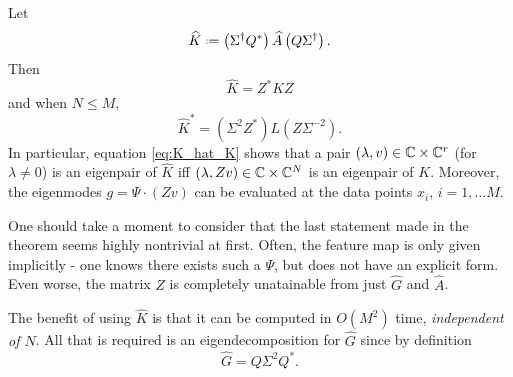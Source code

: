 \begin{theorem}
    \label{thm:K_hat}
    Let 
    \begin{equation}
        \label{eq:K_hat}
        \widehat{K} \defeq 
        \left( \Sigma^\dagger Q^* \right) \widehat{A} \left( Q \Sigma^\dagger \right) . 
    \end{equation}
    Then 
    \begin{equation}
        \label{eq:K_hat_K}
        \widehat{ K } = Z^* K Z
    \end{equation}
    and when $N \leq M$, 
    \begin{equation}
        \widehat{ K }^* = \left( \Sigma^2 Z^* \right) L \left( Z \Sigma^{-2} \right) . 
    \end{equation}
    In particular, equation \ref{eq:K_hat_K} shows that
    a pair $(\lambda, v) \in \mathbb{C} \times \mathbb{C}^r$ (for $\lambda \neq 0$) 
    is an eigenpair of $\widehat{K}$ iff $(\lambda, Z v) \in \mathbb{C} \times \mathbb{C}^N$ is an 
    eigenpair of $K$. Moreover, the eigenmodes $g = \Psi \cdot (Z v)$ can be evaluated 
    at the data points $x_i$, $i = 1, \ldots M$. 
\end{theorem}

One should take a moment to consider that the last statement made in the theorem
seems highly nontrivial at first. Often, the feature map is only given implicitly - one knows 
there exists such a $\Psi$, but does not have an explicit form. Even worse, the matrix 
$Z$ is completely unatainable from just $\widehat{G}$ and $\widehat{A}$. 

The benefit of using $\widehat{K}$ is that it can be computed in $O(M^2)$ time, 
\emph{independent of $N$}. All that is required is an eigendecomposition for $\widehat{G}$ 
since by definition 
\begin{equation}
    \widehat{G} = Q \Sigma^2 Q^* . 
\end{equation} 

